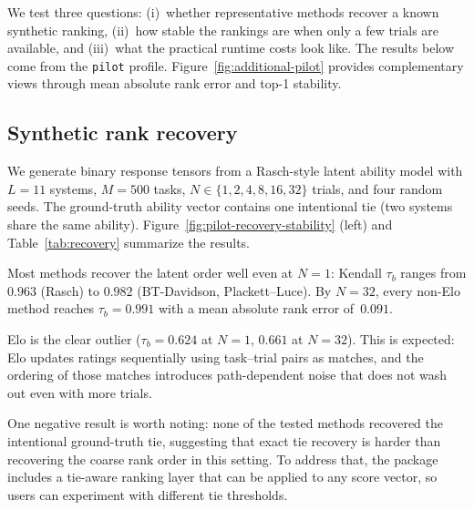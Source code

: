 \documentclass{juliacon}
\begin{document}
We test three questions: (i)~whether representative methods recover a known synthetic ranking, (ii)~how stable the rankings are when only a few trials are available, and (iii)~what the practical runtime costs look like. The results below come from the \texttt{pilot} profile. Figure~\ref{fig:additional-pilot} provides complementary views through mean absolute rank error and top-1 stability.

\subsection{Synthetic rank recovery}

We generate binary response tensors from a Rasch-style latent ability model with \(L=11\) systems, \(M=500\) tasks, \(N \in \{1,2,4,8,16,32\}\) trials, and four random seeds. The ground-truth ability vector contains one intentional tie (two systems share the same ability). Figure~\ref{fig:pilot-recovery-stability} (left) and Table~\ref{tab:recovery} summarize the results.

Most methods recover the latent order well even at \(N=1\): Kendall \(\tau_b\) ranges from \(0.963\) (Rasch) to \(0.982\) (BT-Davidson, Plackett--Luce). By \(N=32\), every non-Elo method reaches \(\tau_b=0.991\) with a mean absolute rank error of~\(0.091\).

Elo is the clear outlier (\(\tau_b = 0.624\) at \(N=1\), \(0.661\) at \(N=32\)). This is expected: Elo updates ratings sequentially using task--trial pairs as matches, and the ordering of those matches introduces path-dependent noise that does not wash out even with more trials.

One negative result is worth noting: none of the tested methods recovered the intentional ground-truth tie, suggesting that exact tie recovery is harder than recovering the coarse rank order in this setting. To address that, the package includes a tie-aware ranking layer that can be applied to any score vector, so users can experiment with different tie thresholds.
\end{document}
